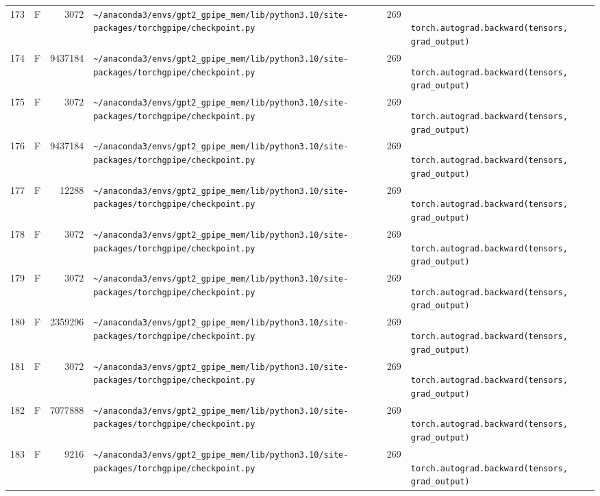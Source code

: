 \documentclass{article}
\begin{document}
\begin{longtable}{r l r p{6.5cm} r p{7.0cm}}
173 & F & 3072 & \lstinline|~/anaconda3/envs/gpt2_gpipe_mem/lib/python3.10/site-packages/torchgpipe/checkpoint.py| & 269 & \lstinline|            torch.autograd.backward(tensors, grad_output)| \\
174 & F & 9437184 & \lstinline|~/anaconda3/envs/gpt2_gpipe_mem/lib/python3.10/site-packages/torchgpipe/checkpoint.py| & 269 & \lstinline|            torch.autograd.backward(tensors, grad_output)| \\
175 & F & 3072 & \lstinline|~/anaconda3/envs/gpt2_gpipe_mem/lib/python3.10/site-packages/torchgpipe/checkpoint.py| & 269 & \lstinline|            torch.autograd.backward(tensors, grad_output)| \\
176 & F & 9437184 & \lstinline|~/anaconda3/envs/gpt2_gpipe_mem/lib/python3.10/site-packages/torchgpipe/checkpoint.py| & 269 & \lstinline|            torch.autograd.backward(tensors, grad_output)| \\
177 & F & 12288 & \lstinline|~/anaconda3/envs/gpt2_gpipe_mem/lib/python3.10/site-packages/torchgpipe/checkpoint.py| & 269 & \lstinline|            torch.autograd.backward(tensors, grad_output)| \\
178 & F & 3072 & \lstinline|~/anaconda3/envs/gpt2_gpipe_mem/lib/python3.10/site-packages/torchgpipe/checkpoint.py| & 269 & \lstinline|            torch.autograd.backward(tensors, grad_output)| \\
179 & F & 3072 & \lstinline|~/anaconda3/envs/gpt2_gpipe_mem/lib/python3.10/site-packages/torchgpipe/checkpoint.py| & 269 & \lstinline|            torch.autograd.backward(tensors, grad_output)| \\
180 & F & 2359296 & \lstinline|~/anaconda3/envs/gpt2_gpipe_mem/lib/python3.10/site-packages/torchgpipe/checkpoint.py| & 269 & \lstinline|            torch.autograd.backward(tensors, grad_output)| \\
181 & F & 3072 & \lstinline|~/anaconda3/envs/gpt2_gpipe_mem/lib/python3.10/site-packages/torchgpipe/checkpoint.py| & 269 & \lstinline|            torch.autograd.backward(tensors, grad_output)| \\
182 & F & 7077888 & \lstinline|~/anaconda3/envs/gpt2_gpipe_mem/lib/python3.10/site-packages/torchgpipe/checkpoint.py| & 269 & \lstinline|            torch.autograd.backward(tensors, grad_output)| \\
183 & F & 9216 & \lstinline|~/anaconda3/envs/gpt2_gpipe_mem/lib/python3.10/site-packages/torchgpipe/checkpoint.py| & 269 & \lstinline|            torch.autograd.backward(tensors, grad_output)| \\

\end{longtable}
\end{document}
